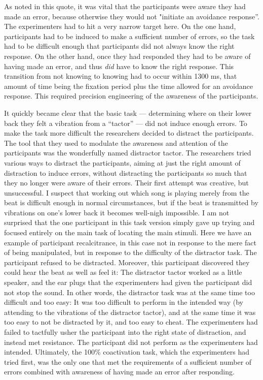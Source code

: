 \documentclass[twocolumn, serif, authordate, reflection]{jote-article}
\begin{document}
As noted in this quote, it was vital that the participants were aware they had made an error, because otherwise they would not "initiate an avoidance response''. The experimenters had to hit a very narrow target here. On the one hand, participants had to be induced to make a sufficient number of errors, so the task had to be difficult enough that participants did not always know the right response. On the other hand, once they had responded they had to be aware of having made an error, and thus \emph{did} have to know the right response. This transition from not knowing to knowing had to occur within 1300 ms, that amount of time being the fixation period plus the time allowed for an avoidance response. This required precision engineering of the awareness of the participants.

It quickly became clear that the basic task — determining where on their lower back they felt a vibration from a ``tactor'' — did not induce enough errors. To make the task more difficult the researchers decided to distract the participants. The tool that they used to modulate the awareness and attention of the participants was the wonderfully named distractor tactor. The researchers tried various ways to distract the participants, aiming at just the right amount of distraction to induce errors, without distracting the participants so much that they no longer were aware of their errors. Their first attempt was creative, but unsuccessful. I suspect that working out which song is playing merely from the beat is difficult enough in normal circumstances, but if the beat is transmitted by vibrations on one's lower back it becomes well-nigh impossible. I am not surprised that the one participant in this task version simply gave up trying and focused entirely on the main task of locating the main stimuli. Here we have an example of participant recalcitrance, in this case not in response to the mere fact of being manipulated, but in response to the difficulty of the distractor task. The participant refused to be distracted. Moreover, this participant discovered they could hear the beat as well as feel it: The distractor tactor worked as a little speaker, and the ear plugs that the experimenters had given the participant did not stop the sound. In other words, the distractor task was at the same time too difficult and too easy: It was too difficult to perform in the intended way (by attending to the vibrations of the distractor tactor), and at the same time it was too easy to not be distracted by it, and too easy to cheat. The experimenters had failed to tactfully usher the participant into the right state of distraction, and instead met resistance. The participant did not perform as the experimenters had intended. Ultimately, the 100\%
coactivation task, which the experimenters had tried first, was the only one that met the requirements of a sufficient number of errors combined with awareness of having made an error after responding.
\end{document}
